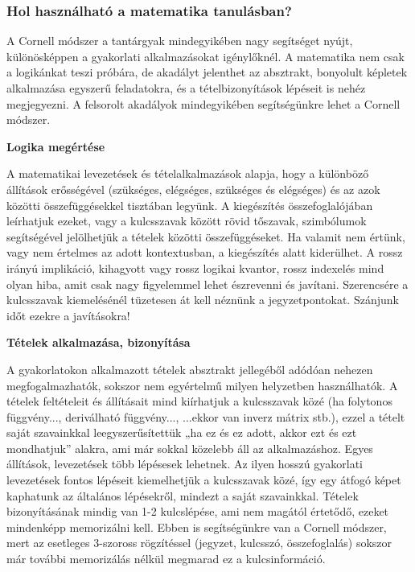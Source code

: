 \documentclass[../Main.tex]{subfiles}
\begin{document}
\subsubsection{Hol használható a matematika tanulásban?}


A Cornell módszer a tantárgyak mindegyikében nagy segítséget nyújt, különösképpen a
gyakorlati alkalmazásokat igénylőknél. A matematika nem csak a logikánkat teszi próbára,
de akadályt jelenthet az absztrakt, bonyolult képletek alkalmazása egyszerű feladatokra, és
a tételbizonyítások lépéseit is nehéz megjegyezni. A felsorolt akadályok mindegyikében
segítségünkre lehet a Cornell módszer.

\textbf{Logika megértése}



    A matematikai levezetések és tételalkalmazások alapja, hogy a különböző állítások
erősségével (szükséges, elégséges, szükséges és elégséges) és az azok közötti
összefüggésekkel tisztában legyünk. A kiegészítés összefoglalójában leírhatjuk ezeket,
vagy a kulcsszavak között rövid tőszavak, szimbólumok segítségével jelölhetjük a tételek
közötti összefüggéseket. Ha valamit nem értünk, vagy nem értelmes az adott
kontextusban, a kiegészítés alatt kiderülhet. A rossz irányú implikáció, kihagyott vagy
rossz logikai kvantor, rossz indexelés mind olyan hiba, amit csak nagy figyelemmel lehet
észrevenni és javítani. Szerencsére a kulcsszavak kiemelésénél tüzetesen át kell néznünk a
jegyzetpontokat. Szánjunk időt ezekre a javításokra!

\textbf{Tételek alkalmazása, bizonyítása}


A gyakorlatokon alkalmazott tételek absztrakt jellegéből adódóan nehezen
megfogalmazhatók, sokszor nem egyértelmű milyen helyzetben használhatók. A tételek
feltételeit és állításait mind kiírhatjuk a kulcsszavak közé (ha folytonos függvény...,
deriválható függvény..., ...ekkor van inverz mátrix stb.), ezzel a tételt saját szavainkkal
leegyszerűsítettük „ha ez és ez adott, akkor ezt és ezt mondhatjuk” alakra, ami már sokkal
közelebb áll az alkalmazáshoz. Egyes állítások, levezetések több lépésesek lehetnek. Az
ilyen hosszú gyakorlati levezetések fontos lépéseit kiemelhetjük a kulcsszavak közé, így
egy átfogó képet kaphatunk az általános lépésekről, mindezt a saját szavainkkal.
Tételek bizonyításának mindig van 1-2 kulcslépése, ami nem magától értetődő, ezeket
mindenképp memorizálni kell. Ebben is segítségünkre van a Cornell módszer, mert az
esetleges 3-szoross rögzítéssel (jegyzet, kulcsszó, összefoglalás) sokszor már további
memorizálás nélkül megmarad ez a kulcsinformáció.
\end{document}
